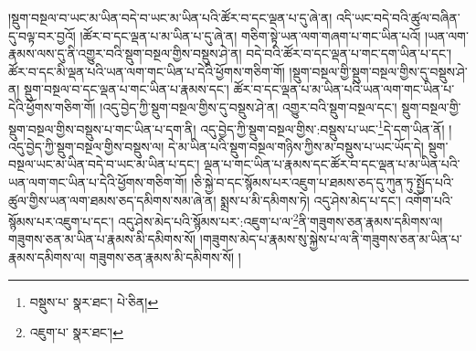 །སྡུག་བསྔལ་བ་ཡང་མ་ཡིན་བདེ་བ་ཡང་མ་ཡིན་པའི་ཚོར་བ་དང་ལྡན་པ་དུ་ཞེ་ན། འདི་ཡང་བདེ་བའི་ཚུལ་བཞིན་དུ་བལྟ་བར་བྱའོ། །ཚོར་བ་དང་ལྡན་པ་མ་ཡིན་པ་དུ་ཞེ་ན། གཅིག་སྟེ་ཡན་ལག་གཞག་པ་གང་ཡིན་པའོ། །ཡན་ལག་རྣམས་ལས་དུ་ནི་འགྱུར་བའི་སྡུག་བསྔལ་གྱིས་བསྡུས་ཤེ་ན། བདེ་བའི་ཚོར་བ་དང་ལྡན་པ་གང་དག་ཡིན་པ་དང་། ཚོར་བ་དང་མི་ལྡན་པའི་ཡན་ལག་གང་ཡིན་པ་དེའི་ཕྱོགས་གཅིག་གོ། །སྡུག་བསྔལ་གྱི་སྡུག་བསྔལ་གྱིས་དུ་བསྡུས་ཤེ་ན། སྡུག་བསྔལ་བ་དང་ལྡན་པ་གང་ཡིན་པ་རྣམས་དང་། ཚོར་བ་དང་ལྡན་པ་མ་ཡིན་པའི་ཡན་ལག་གང་ཡིན་པ་དེའི་ཕྱོགས་གཅིག་གོ། །འདུ་བྱེད་ཀྱི་སྡུག་བསྔལ་གྱིས་དུ་བསྡུས་ཤེ་ན། འགྱུར་བའི་སྡུག་བསྔལ་དང་། སྡུག་བསྔལ་གྱི་སྡུག་བསྔལ་གྱིས་བསྡུས་པ་གང་ཡིན་པ་དག་ནི། འདུ་བྱེད་ཀྱི་སྡུག་བསྔལ་གྱིས་:བསྡུས་པ་ཡང་\footnote{བསྡུས་པ་  སྣར་ཐང་།  པེ་ཅིན། }དེ་དག་ཡིན་ནོ། །འདུ་བྱེད་ཀྱི་སྡུག་བསྔལ་གྱིས་བསྡུས་ལ། དེ་མ་ཡིན་པའི་སྡུག་བསྔལ་གཉིས་ཀྱིས་མ་བསྡུས་པ་ཡང་ཡོད་དེ། སྡུག་བསྔལ་ཡང་མ་ཡིན་བདེ་བ་ཡང་མ་ཡིན་པ་དང་། ལྡན་པ་གང་ཡིན་པ་རྣམས་དང་ཚོར་བ་དང་ལྡན་པ་མ་ཡིན་པའི་ཡན་ལག་གང་ཡིན་པ་དེའི་ཕྱོགས་གཅིག་གོ། །ཅི་སྐྱེ་བ་དང་སྙོམས་པར་འཇུག་པ་ཐམས་ཅད་དུ་ཀུན་ཏུ་སྤྱོད་པའི་ཚུལ་གྱིས་ཡན་ལག་ཐམས་ཅད་དམིགས་སམ་ཞེ་ན། སྨྲས་པ་མི་དམིགས་ཏེ། འདུ་ཤེས་མེད་པ་དང་། འགོག་པའི་སྙོམས་པར་འཇུག་པ་དང་། འདུ་ཤེས་མེད་པའི་སྙོམས་པར་:འཇུག་པ་ལ་\footnote{འཇུག་པ་  སྣར་ཐང་། }ནི་གཟུགས་ཅན་རྣམས་དམིགས་ལ། གཟུགས་ཅན་མ་ཡིན་པ་རྣམས་མི་དམིགས་སོ། །གཟུགས་མེད་པ་རྣམས་སུ་སྐྱེས་པ་ལ་ནི་གཟུགས་ཅན་མ་ཡིན་པ་རྣམས་དམིགས་ལ། གཟུགས་ཅན་རྣམས་མི་དམིགས་སོ། །
